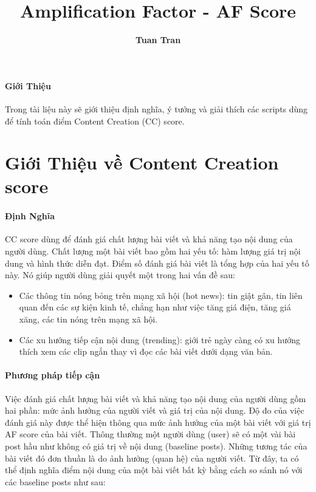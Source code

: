 \documentclass[12pt]{article}
\title{Amplification Factor - AF Score}
\author{{\bf Tuan Tran}}
\numberwithin{equation}{section}
\begin{document}
\maketitle
\paragraph{Giới Thiệu} Trong tài liệu này sẽ giới thiệu định nghĩa, ý tưởng và giải thích các scripts dùng để tính toán điểm Content Creation (CC) score.

\section{Giới Thiệu về Content Creation score}

\paragraph{Định Nghĩa} CC score dùng để đánh giá chất lượng bài viết và khả năng tạo nội dung của người dùng. Chất lượng một bài viết bao gồm hai yếu tố: hàm lượng giá trị nội dung và hình thức diễn đạt. Điểm số đánh giá bài viết là tổng hợp của hai yếu tố này. Nó giúp người dùng giải quyết một trong hai vấn đề sau:

\begin{itemize} 

\item Các thông tin nóng bỏng trên mạng xã hội (hot news): tin giật gân, tin liên quan đến các sự kiện kinh tế, chẳng hạn như việc tăng giá điện, tăng giá xăng, các tin nóng trên mạng xã hội.


\item Các xu hướng tiếp cận nội dung (trending): giới trẻ ngày càng có xu hướng thích xem các clip ngắn thay vì đọc các bài viết dưới dạng văn bản.

\end{itemize}


\paragraph{Phương pháp tiếp cận} Việc đánh giá chất lượng bài viết và khả năng tạo nội dung của người dùng gồm hai phần: mức ảnh hưởng của người viết và giá trị của nội dung. Độ đo của việc đánh giá này được thể hiện thông qua mức ảnh hưởng của một bài viết với giá trị AF score của bài viết. Thông thường một người dùng (user) sẽ có một vài bài post hầu như không có giá trị về nội dung (baseline posts). Những tương tác của bài viết đó đơn thuần là do ảnh hưởng (quan hệ) của người viết. Từ đây, ta có thể định nghĩa điểm nội dung của một bài viết bất kỳ bằng cách so sánh nó với các baseline posts như sau:
\end{document}
